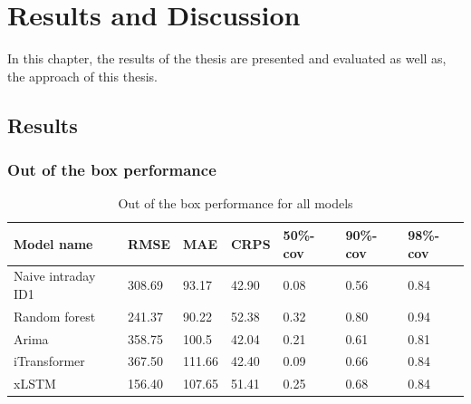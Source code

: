 \documentclass[class=scrbook, crop=false]{standalone}
\begin{document}
\chapter{Results and Discussion} %
\label{Chapter::Results and Discussion}
    In this chapter, the results of the thesis are presented and evaluated as well as, the approach of this thesis.

\section{Results}
\label{Section::Results}

\subsection{Out of the box performance}
  
  \begin{table}[]
\centering
\begin{tabular}{l|l|l|l|l|l|l}
Model name &  RMSE & MAE & CRPS & 50\%-cov & 90\%-cov & 98\%-cov \\\hline
Naive intraday ID1 & 308.69 & 93.17 & 42.90 & 0.08 & 0.56 & 0.84 \\
Random forest & 241.37 & 90.22 & 52.38 & 0.32 & 0.80 & 0.94 \\
Arima & 358.75 & 100.5 & 42.04  & 0.21 & 0.61 & 0.81 \\
iTransformer & 367.50 & 111.66 & 42.40 & 0.09 & 0.66 & 0.84 \\
xLSTM &  156.40 & 107.65 & 51.41 & 0.25 & 0.68 & 0.84 \\
\end{tabular}
\caption{Out of the box performance for all models}
\label{Table::Out_of_the_box_performance}
\end{table}
\end{document}
